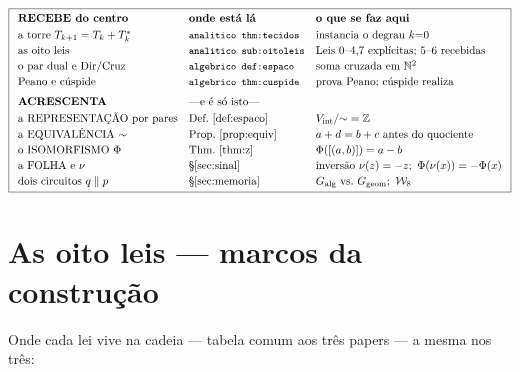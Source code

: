 \documentclass[11pt,a4paper]{article}
\newcommand{\code}[1]{\texttt{\small #1}}
\newcommand{\Word}{\mathcal{W}}
\begin{document}
\[
\boxed{
\begin{array}{lll}
\textbf{RECEBE do centro} & \textbf{onde está lá} & \textbf{o que se faz aqui}\\[3pt]
\text{a torre }T_{k+1}=T_k+T_k^{*} & \code{analitico thm:tecidos} & \text{instancia o degrau }k{=}0\\[2pt]
\text{as oito leis} & \code{analitico sub:oitoleis} & \text{Leis 0--4,7 explícitas; 5--6 recebidas}\\[2pt]
\text{o par dual e Dir/Cruz} & \code{algebrico def:espaco} & \text{soma cruzada em }\mathbb{N}^{2}\\[2pt]
\text{Peano e cúspide} & \code{algebrico thm:cuspide} & \text{prova Peano; cúspide realiza}\\[6pt]
\textbf{ACRESCENTA} & \multicolumn{2}{l}{\text{---e é só isto---}}\\[3pt]
\text{a REPRESENTAÇÃO por pares} & \text{Def.~\ref{def:espaco}} & V_{\mathrm{int}}/{\sim}=\mathbb{Z}\\[2pt]
\text{a EQUIVALÊNCIA }{\sim} & \text{Prop.~\ref{prop:equiv}} & a+d=b+c\ \text{antes do quociente}\\[2pt]
\text{o ISOMORFISMO }\Phi & \text{Thm.~\ref{thm:z}} & \Phi([(a,b)])=a-b\\[2pt]
\text{a FOLHA e }\nu & \text{§\ref{sec:sinal}} & \text{inversão }\nu(z)=-z;\ \Phi(\nu(x))=-\Phi(x)\\[2pt]
\text{dois circuitos }q\parallel p & \text{§\ref{sec:memoria}} & G_{\mathrm{alg}}\ \text{vs.}\ G_{\mathrm{geom}};\ \Word_8
\end{array}}
\]

\section{As oito leis --- marcos da construção}\label{sec:leis}

\noindent Onde cada lei vive na cadeia --- tabela comum aos três papers
--- a mesma nos três:
\end{document}

